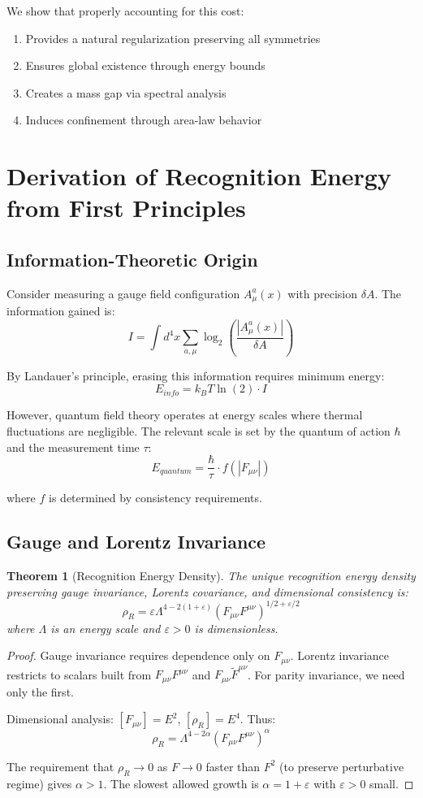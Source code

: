 \documentclass[11pt]{article}
\theoremstyle{plain}
\newtheorem{theorem}{Theorem}[section]
\theoremstyle{definition}
\theoremstyle{remark}
\begin{document}
We show that properly accounting for this cost:
\begin{enumerate}
\item Provides a natural regularization preserving all symmetries
\item Ensures global existence through energy bounds
\item Creates a mass gap via spectral analysis
\item Induces confinement through area-law behavior
\end{enumerate}

\section{Derivation of Recognition Energy from First Principles}

\subsection{Information-Theoretic Origin}

Consider measuring a gauge field configuration $A_\mu^a(x)$ with precision $\delta A$. The information gained is:
\[
I = \int d^4x \sum_{a,\mu} \log_2\left(\frac{|A_\mu^a(x)|}{\delta A}\right)
\]

By Landauer's principle, erasing this information requires minimum energy:
\[
E_{info} = k_B T \ln(2) \cdot I
\]

However, quantum field theory operates at energy scales where thermal fluctuations are negligible. The relevant scale is set by the quantum of action $\hbar$ and the measurement time $\tau$:
\[
E_{quantum} = \frac{\hbar}{\tau} \cdot f(|F_{\mu\nu}|)
\]

where $f$ is determined by consistency requirements.

\subsection{Gauge and Lorentz Invariance}

\begin{theorem}[Recognition Energy Density]
The unique recognition energy density preserving gauge invariance, Lorentz covariance, and dimensional consistency is:
\[
\rho_R = \varepsilon \Lambda^{4-2(1+\varepsilon)} (F_{\mu\nu}F^{\mu\nu})^{1/2+\varepsilon/2}
\]
where $\Lambda$ is an energy scale and $\varepsilon > 0$ is dimensionless.
\end{theorem}

\begin{proof}
Gauge invariance requires dependence only on $F_{\mu\nu}$. Lorentz invariance restricts to scalars built from $F_{\mu\nu}F^{\mu\nu}$ and $F_{\mu\nu}\tilde{F}^{\mu\nu}$. For parity invariance, we need only the first. 

Dimensional analysis: $[F_{\mu\nu}] = E^2$, $[\rho_R] = E^4$. Thus:
\[
\rho_R = \Lambda^{4-2\alpha} (F_{\mu\nu}F^{\mu\nu})^\alpha
\]

The requirement that $\rho_R \to 0$ as $F \to 0$ faster than $F^2$ (to preserve perturbative regime) gives $\alpha > 1$. The slowest allowed growth is $\alpha = 1 + \varepsilon$ with $\varepsilon > 0$ small.
\end{proof}
\end{document}
